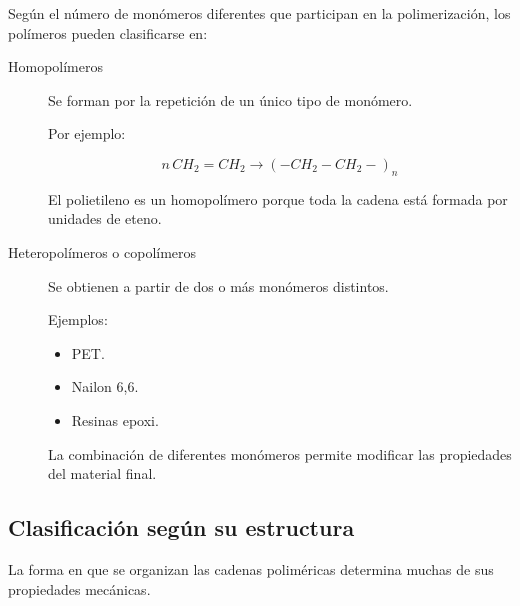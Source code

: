 Según el número de monómeros diferentes que participan en la polimerización, los polímeros pueden clasificarse en:

\begin{description}

\item[Homopolímeros]

Se forman por la repetición de un único tipo de monómero.

Por ejemplo:

\[
n\,CH_2=CH_2
\longrightarrow
(-CH_2-CH_2-)_n
\]

El polietileno es un homopolímero porque toda la cadena está formada por unidades de eteno.

\vspace{0.3cm}

\item[Heteropolímeros o copolímeros]

Se obtienen a partir de dos o más monómeros distintos.

Ejemplos:

\begin{itemize}

\item PET.

\item Nailon 6,6.

\item Resinas epoxi.

\end{itemize}

La combinación de diferentes monómeros permite modificar las propiedades del material final.

\end{description}


\subsection{Clasificación según su estructura}

La forma en que se organizan las cadenas poliméricas determina muchas de sus propiedades mecánicas.

